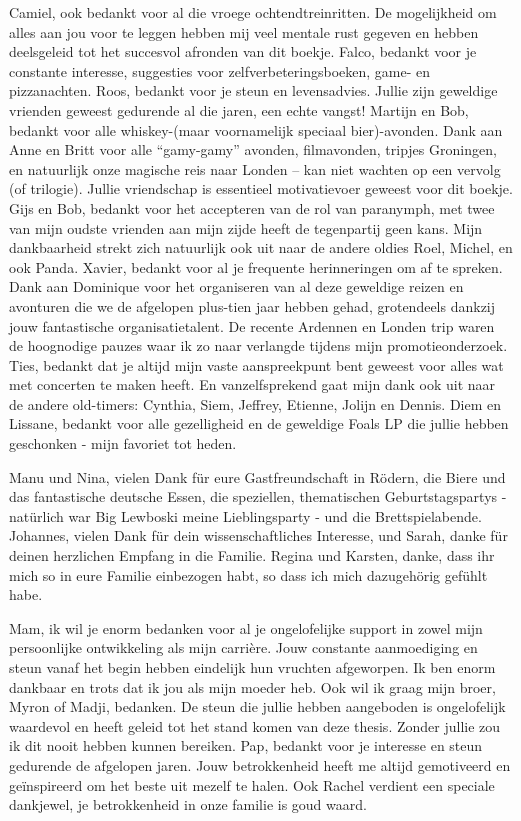 Camiel, ook bedankt voor al die vroege ochtendtreinritten. De mogelijkheid om alles aan jou voor te leggen hebben mij veel mentale rust gegeven en hebben deelsgeleid tot het succesvol afronden van dit boekje. Falco, bedankt voor je constante interesse, suggesties voor zelfverbeteringsboeken, game- en pizzanachten. Roos, bedankt voor je steun en levensadvies. Jullie zijn geweldige vrienden geweest gedurende al die jaren, een echte vangst! Martijn en Bob, bedankt voor alle whiskey-(maar voornamelijk speciaal bier)-avonden. Dank aan Anne en Britt voor alle ``gamy-gamy'' avonden, filmavonden, tripjes Groningen, en natuurlijk onze magische reis naar Londen -- kan niet wachten op een vervolg (of trilogie). Jullie vriendschap is essentieel motivatievoer geweest voor dit boekje. Gijs en Bob, bedankt voor het accepteren van de rol van paranymph, met twee van mijn oudste vrienden aan mijn zijde heeft de tegenpartij geen kans. Mijn dankbaarheid strekt zich natuurlijk ook uit naar de andere oldies Roel, Michel, en ook Panda. Xavier, bedankt voor al je frequente herinneringen om af te spreken. Dank aan Dominique voor het organiseren van al deze geweldige reizen en avonturen die we de afgelopen plus-tien jaar hebben gehad, grotendeels dankzij jouw fantastische organisatietalent. De recente Ardennen en Londen trip waren de hoognodige pauzes waar ik zo naar verlangde tijdens mijn promotieonderzoek. Ties, bedankt dat je altijd mijn vaste aanspreekpunt bent geweest voor alles wat met concerten te maken heeft. En vanzelfsprekend gaat mijn dank ook uit naar de andere old-timers: Cynthia, Siem, Jeffrey, Etienne, Jolijn en Dennis. Diem en Lissane, bedankt voor alle gezelligheid en de geweldige Foals LP die jullie hebben geschonken - mijn favoriet tot heden.

Manu und Nina, vielen Dank f\"{u}r eure Gastfreundschaft in R\"{o}dern, die Biere und das fantastische deutsche Essen, die speziellen, thematischen Geburtstagspartys - nat\"{u}rlich war Big Lewboski meine Lieblingsparty - und die Brettspielabende. Johannes, vielen Dank f\"{u}r dein wissenschaftliches Interesse, und Sarah, danke f\"{u}r deinen herzlichen Empfang in die Familie. Regina und Karsten, danke, dass ihr mich so in eure Familie einbezogen habt, so dass ich mich dazugeh\"{o}rig gef\"{u}hlt habe.

Mam, ik wil je enorm bedanken voor al je ongelofelijke support in zowel mijn persoonlijke ontwikkeling als mijn carrière. Jouw constante aanmoediging en steun vanaf het begin hebben eindelijk hun vruchten afgeworpen. Ik ben enorm dankbaar en trots dat ik jou als mijn moeder heb. Ook wil ik graag mijn broer, Myron of Madji, bedanken. De steun die jullie hebben aangeboden is ongelofelijk waardevol en heeft geleid tot het stand komen van deze thesis. Zonder jullie zou ik dit nooit hebben kunnen bereiken. Pap, bedankt voor je interesse en steun gedurende de afgelopen jaren. Jouw betrokkenheid heeft me altijd gemotiveerd en ge\"{i}nspireerd om het beste uit mezelf te halen. Ook Rachel verdient een speciale dankjewel, je betrokkenheid in onze familie is goud waard.

